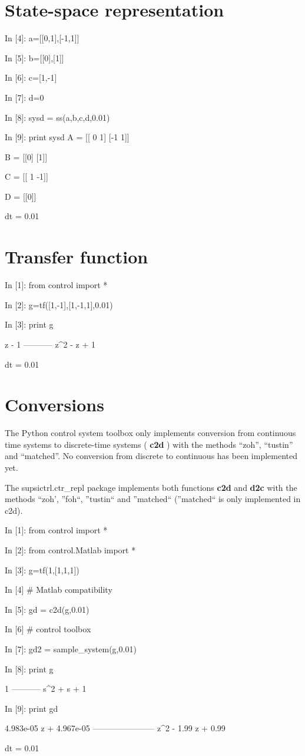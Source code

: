 \section{State-space representation}
\begin{code}
In [4]: a=[[0,1],[-1,1]]

In [5]: b=[[0],[1]]

In [6]: c=[1,-1]

In [7]: d=0

In [8]: sysd = ss(a,b,c,d,0.01)

In [9]: print sysd
A = [[ 0  1]
 [-1  1]]

B = [[0]
 [1]]

C = [[ 1 -1]]

D = [[0]]

dt = 0.01
\end{code}


\section{Transfer function}
\begin{code}
In [1]: from control import *

In [2]: g=tf([1,-1],[1,-1,1],0.01)

In [3]: print g

   z - 1
-----------
z^2 - z + 1

dt = 0.01
\end{code}

\section{Conversions}

The Python control system toolbox only implements conversion from continuous 
time systems to discrete-time systems ( \textbf{c2d} ) with the methods 
``zoh'', ``tustin'' and ``matched''. No conversion from discrete to continuous 
has been implemented yet.

The supsictrl.ctr\_repl package implements both functions \textbf{c2d} and 
\textbf{d2c} with the methods ``zoh', ''foh``, ''tustin`` and ''matched`` 
(''matched`` is only implemented in c2d).

\begin{code}
In [1]: from control import *

In [2]: from control.Matlab import *

In [3]: g=tf(1,[1,1,1])

In [4]  # Matlab compatibility 

In [5]: gd = c2d(g,0.01)             

In [6]  # control toolbox 

In [7]: gd2 = sample_system(g,0.01)  

In [8]: print g

     1
-----------
s^2 + s + 1


In [9]: print gd

4.983e-05 z + 4.967e-05
-----------------------
  z^2 - 1.99 z + 0.99

dt = 0.01
\end{code}

